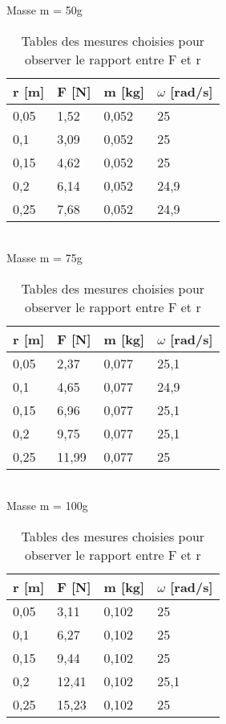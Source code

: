 \begin{table}[ht]
    \centering
    \caption[Tables mesures rayon force]{Tables des mesures choisies pour observer le rapport entre F et r}

    Masse m = 50g\\[1px]
    \begin{tabular}{|l|l|l|l|}
    \hline
	r [m]	&F [N]	&m [kg]	&$\omega$ [rad/s]\\
    \hline
	0,05	&1,52	&0,052	&25              \\
	0,1	&3,09	&0,052	&25              \\
	0,15	&4,62	&0,052	&25              \\
	0,2	&6,14	&0,052	&24,9            \\
	0,25	&7,68	&0,052	&24,9            \\
    \hline
    \end{tabular}\\[5px]

    Masse m = 75g\\[1px]
    \begin{tabular}{|l|l|l|l|}
    \hline
	r [m]	&F [N]	&m [kg]	&$\omega$ [rad/s]\\
    \hline
	0,05	&2,37	&0,077	&25,1            \\
	0,1	&4,65	&0,077	&24,9            \\
	0,15	&6,96	&0,077	&25,1            \\
	0,2	&9,75	&0,077	&25,1            \\
	0,25	&11,99	&0,077	&25              \\
    \hline
    \end{tabular}\\[5px]

    Masse m = 100g\\[1px]
    \begin{tabular}{|l|l|l|l|}
    \hline
	r [m]	&F [N]	&m [kg]	&$\omega$ [rad/s]\\
    \hline
	0,05	&3,11	&0,102	&25              \\
	0,1	&6,27	&0,102	&25              \\
	0,15	&9,44	&0,102	&25              \\
	0,2	&12,41	&0,102	&25,1            \\
	0,25	&15,23	&0,102	&25              \\
    \hline
    \end{tabular}
\end{table}

